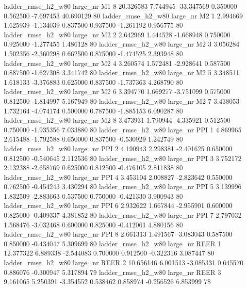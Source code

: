  ladder_rmse_h2_w80   large_nr       M1                 8 20.326583  7.744945 -33.347569 0.350000 0.562500 -7.697453   40.690129 80
 ladder_rmse_h2_w80   large_nr       M2                 1  2.994669  1.625939  -1.134039 0.837500 0.937500 -1.261192    0.956775 80
 ladder_rmse_h2_w80   large_nr       M2                 2  2.642969  1.444528  -1.668948 0.750000 0.925000 -1.277455    1.486128 80
 ladder_rmse_h2_w80   large_nr       M2                 3  3.056284  1.502356  -2.360298 0.662500 0.875000 -1.474525    2.393948 80
 ladder_rmse_h2_w80   large_nr       M2                 4  3.260574  1.572481  -2.928641 0.587500 0.887500 -1.627308    3.341742 80
 ladder_rmse_h2_w80   large_nr       M2                 5  3.348511  1.618133  -3.376883 0.625000 0.837500 -1.737363    4.268790 80
 ladder_rmse_h2_w80   large_nr       M2                 6  3.394770  1.669277  -3.751099 0.575000 0.812500 -1.814997    5.167949 80
 ladder_rmse_h2_w80   large_nr       M2                 7  3.438053  1.732164  -4.074174 0.500000 0.787500 -1.885153    6.090287 80
 ladder_rmse_h2_w80   large_nr       M2                 8  3.473931  1.790944  -4.335921 0.512500 0.750000 -1.935356    7.033880 80
 ladder_rmse_h2_w80   large_nr      PPI                 1  4.869965  2.615488  -1.792588 0.650000 0.837500 -0.530929    1.242749 80
 ladder_rmse_h2_w80   large_nr      PPI                 2  4.190943  2.298381  -2.401625 0.650000 0.812500 -0.540645    2.112536 80
 ladder_rmse_h2_w80   large_nr      PPI                 3  3.752172  2.132388  -2.658769 0.625000 0.812500 -0.476105    2.811838 80
 ladder_rmse_h2_w80   large_nr      PPI                 4  3.453104  2.008827  -2.823642 0.550000 0.762500 -0.454243    3.430294 80
 ladder_rmse_h2_w80   large_nr      PPI                 5  3.139996  1.832509  -2.883663 0.537500 0.750000 -0.421330    3.900943 80
 ladder_rmse_h2_w80   large_nr      PPI                 6  2.932622  1.667844  -2.955901 0.600000 0.825000 -0.409337    4.381852 80
 ladder_rmse_h2_w80   large_nr      PPI                 7  2.797032  1.568476  -3.032468 0.600000 0.825000 -0.412061    4.880156 80
 ladder_rmse_h2_w80   large_nr      PPI                 8  2.661313  1.491567  -3.083043 0.587500 0.850000 -0.434047    5.309699 80
 ladder_rmse_h2_w80   large_nr     REER                 1 12.377322  6.889338  -2.544083 0.700000 0.912500 -0.322316    3.087447 80
 ladder_rmse_h2_w80   large_nr     REER                 2 10.656146  6.001513  -3.085331 0.645570 0.886076 -0.300947    5.317894 79
 ladder_rmse_h2_w80   large_nr     REER                 3  9.161065  5.250391  -3.354552 0.538462 0.858974 -0.256526    6.853999 78
